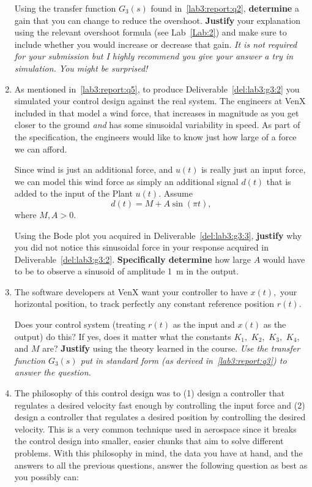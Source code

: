 \begin{deliverable}[label={lab3:report}]
\begin{enumerate}[label={(\arabic*)}]
{      Using the transfer function \(G_3(s)\) found in~\ref{lab3:report:q2}, \textbf{determine} a gain that you can change to reduce the overshoot.
      \textbf{Justify} your explanation using the relevant overshoot formula (see Lab~\ref{Lab:2}) and make sure to include whether you would increase or decrease that gain.
      \emph{It is not required for your submission but I highly recommend you give your answer a try in simulation. You might be surprised!}
      \label{lab3:report:q4}
    }
    \item{%
      As mentioned in~\ref{lab3:report:q5}, to produce Deliverable~\ref{del:lab3:g3:2} you simulated your control design against the real system.
      The engineers at VenX included in that model a wind force, that increases in magnitude as you get closer to the ground \emph{and} has some sinusoidal variability in speed.
      As part of the specification, the engineers would like to know just how large of a force we can afford.

      Since wind is just an additional force, and \(u(t)\) is really just an input force, we can model this wind force as simply an additional signal \(d(t)\) that is added to the input of the Plant \(u(t).\)
      Assume
      \[
        d(t) = M + A\sin\left(\pi t\right),
      \]
      where \(M, A > 0\).

      Using the Bode plot you acquired in Deliverable~\ref{del:lab3:g3:3},
      \textbf{justify} why you did not notice this sinusoidal force in your response acquired in Deliverable~\ref{del:lab3:g3:2}.
      \textbf{Specifically determine} how large \(A\) would have to be to observe a sinusoid of amplitude \SI{1}{m} in the output.
      \label{lab3:report:q5}
    }
    \item{%
      The software developers at VenX want your controller to have \(x(t),\) your horizontal position, to track perfectly any constant reference position \(r(t).\)

      Does your control system (treating \(r(t)\) as the input and \(x(t)\) as the output) do this?
      If yes, does it matter what the constants \(K_1,\) \(K_2,\) \(K_3,\) \(K_4,\) and \(M\) are?
      \textbf{Justify} using the theory learned in the course.
      \emph{Use the transfer function \(G_3(s)\) put in standard form (as derived in~\ref{lab3:report:q3}) to answer the question.}
      \label{lab3:report:q6}
    }
    \item{%
      The philosophy of this control design was to (1) design a controller that regulates a desired velocity fast enough by controlling the input force and (2) design a controller that regulates a desired position by controlling the desired velocity.
      This is a very common technique used in aerospace since it breaks the control design into smaller, easier chunks that aim to solve different problems.
      With this philosophy in mind, the data you have at hand, and the answers to all the previous questions, answer the following question as best as you possibly can:

}
\end{enumerate}
\end{deliverable}
